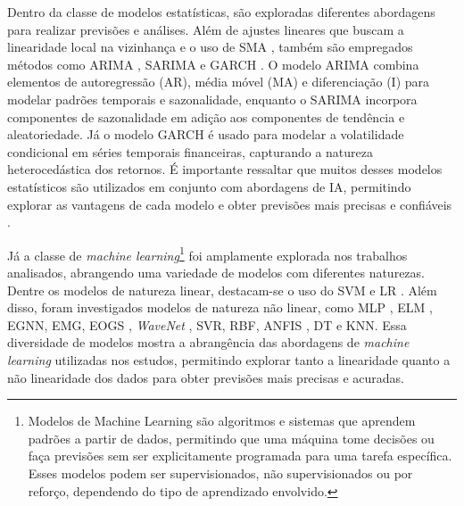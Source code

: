 Dentro da classe de modelos estatísticas, são exploradas diferentes abordagens para realizar previsões e análises. Além de ajustes lineares que buscam a linearidade local na vizinhança \cite{Charlene} e o uso de \ac{SMA} \cite{Ciniro_Econometric}, também são empregados métodos como \ac{ARIMA} \cite{Leonardo_Comparative, gao2021stock}, \ac{SARIMA} e \ac{GARCH} \cite{Ciniro_Econometric}. O modelo \ac{ARIMA} combina elementos de autoregressão (AR), média móvel (MA) e diferenciação (I) para modelar padrões temporais e sazonalidade, enquanto o \ac{SARIMA} incorpora componentes de sazonalidade em adição aos componentes de tendência e aleatoriedade. Já o modelo \ac{GARCH} é usado para modelar a volatilidade condicional em séries temporais financeiras, capturando a natureza heterocedástica dos retornos. É importante ressaltar que muitos desses modelos estatísticos são utilizados em conjunto com abordagens de \ac{IA}, permitindo explorar as vantagens de cada modelo e obter previsões mais precisas e confiáveis \cite{Ciniro_Econometric}.

Já a classe de \textit{machine learning}\footnote{Modelos de Machine Learning são algoritmos e sistemas que aprendem padrões a partir de dados, permitindo que uma máquina tome decisões ou faça previsões sem ser explicitamente programada para uma tarefa específica. Esses modelos podem ser supervisionados, não supervisionados ou por reforço, dependendo do tipo de aprendizado envolvido.} foi amplamente explorada nos trabalhos analisados, abrangendo uma variedade de modelos com diferentes naturezas. Dentre os modelos de natureza linear, destacam-se o uso do \ac{SVM} \cite{altan2019effect, Anand_Comparison} e \ac{LR} \cite{pabucccu2023forecasting}. Além disso, foram investigados modelos de natureza não linear, como \ac{MLP} \cite{Jerzy_Deep, Faramarz_Integrating}, \ac{ELM} \cite{Manrui_two-stage}, \ac{EGNN}, \ac{EMG}, \ac{EOGS} \cite{vinicius_sistemas}, \textit{WaveNet} \cite{Leonardo_Comparative}, \ac{SVR}, \ac{RBF}, \ac{ANFIS} \cite{Faramarz_Integrating}, \ac{DT} e \ac{KNN}\cite{halil2019predicting}. Essa diversidade de modelos mostra a abrangência das abordagens de \textit{machine learning} utilizadas nos estudos, permitindo explorar tanto a linearidade quanto a não linearidade dos dados para obter previsões mais precisas e acuradas.


